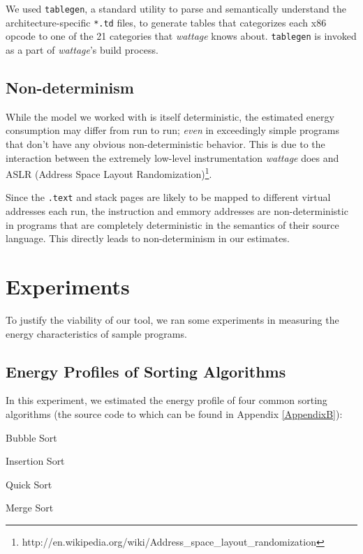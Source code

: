 We used \texttt{tablegen}, a standard utility to parse and
semantically understand the architecture-specific \texttt{*.td} files,
to generate tables that categorizes each x86 opcode to one of the 21
categories that \textit{wattage} knows about.  \texttt{tablegen} is
invoked as a part of \textit{wattage}'s build process.

\subsection{Non-determinism}

While the model we worked with is itself deterministic, the estimated
energy consumption may differ from run to run; \textit{even} in
exceedingly simple programs that don't have any obvious
non-deterministic behavior.  This is due to the interaction between
the extremely low-level instrumentation \textit{wattage} does and ASLR
(Address Space Layout
Randomization)\footnote{http://en.wikipedia.org/wiki/Address\_space\_layout\_randomization}.

Since the \texttt{.text} and stack pages are likely to be mapped to
different virtual addresses each run, the instruction and emmory
addresses are non-deterministic in programs that are completely
deterministic in the semantics of their source language.  This
directly leads to non-determinism in our estimates.

\section{Experiments}

To justify the viability of our tool, we ran some experiments in
measuring the energy characteristics of sample programs.

\subsection{Energy Profiles of Sorting Algorithms}

In this experiment, we estimated the energy profile of four common
sorting algorithms (the source code to which can be found in Appendix
\ref{AppendixB}):

\begin{itemize*}
\item Bubble Sort
\item Insertion Sort
\item Quick Sort
\item Merge Sort
\end{itemize*}

